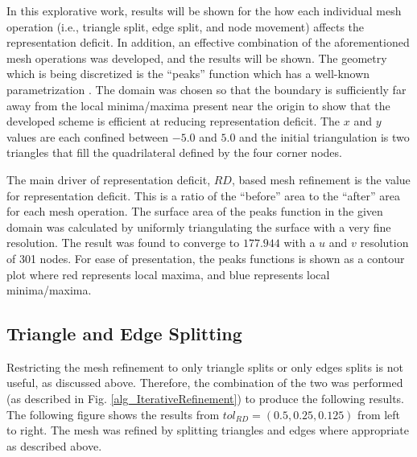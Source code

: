 In this explorative work, results will be shown for the how each
individual mesh operation (i.e., triangle split, edge split, and node 
movement) affects the representation deficit. In addition, an effective
combination of the aforementioned mesh operations was developed, and the
results will be shown. The geometry which is being discretized is the
``peaks'' function which has a well-known parametrization
\cite{peaksMatlab}. The domain was chosen so that the boundary is
sufficiently far away from the local minima/maxima present near the origin to
show that the developed scheme is efficient at reducing representation
deficit. The $x$ and $y$ values are each confined between $-5.0$ and
$5.0$ and the initial triangulation is two triangles that fill the
quadrilateral defined by the four corner nodes.

The main driver of representation deficit, $RD$, based mesh refinement
is the value for representation deficit. This is a ratio of the
``before'' area to the ``after'' area for each mesh operation. The
surface area of the peaks function in the given domain was calculated by
uniformly triangulating the surface with a very fine resolution. The
result was found to converge to $177.944$ with a $u$ and $v$ resolution
of 301 nodes. For ease of presentation, the peaks functions is shown as
a contour plot where red represents local maxima, and blue represents
local minima/maxima.

\subsection{Triangle and Edge Splitting}
Restricting the mesh refinement to only triangle splits or only edges
splits is not useful, as discussed above. Therefore, the combination of
the two was performed (as described in Fig. \ref{alg_IterativeRefinement})
to produce the following results. The following figure shows the results
from $tol_{RD}=\left(0.5,0.25,0.125\right)$ from left to right. The mesh was
refined by splitting triangles and edges where appropriate as described
above.

